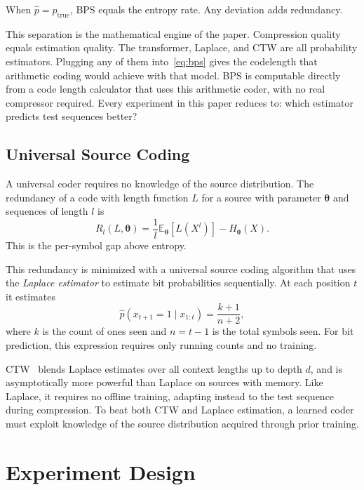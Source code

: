 \documentclass[onecolumn,english,12pt]{IEEEtran}
\theoremstyle{plain}
\theoremstyle{plain}
\theoremstyle{plain}
\theoremstyle{definition}
\begin{document}
When $\hat{p} = p_{\mathrm{true}}$, BPS equals the entropy rate. Any
deviation adds redundancy.

This separation is the mathematical engine of the paper. Compression
quality equals estimation quality. The transformer, Laplace, and CTW
are all probability estimators. Plugging any of them into~\eqref{eq:bps}
gives the codelength that arithmetic coding would achieve with that
model. BPS is computable directly from a code length calculator that uses this arithmetic coder, with no real compressor required. Every experiment in this paper reduces to: which estimator predicts test sequences better?

\subsection{Universal Source Coding}
\label{sec:universal}

A universal coder requires no knowledge of the source distribution. The redundancy of a code with length function $L$ for a source with
parameter $\boldsymbol{\theta}$ and sequences of length $l$ is
\begin{equation}
  R_l(L, \boldsymbol{\theta}) = \frac{1}{l}\mathbb{E}_{\boldsymbol{\theta}}[L(X^l)] - H_{\boldsymbol{\theta}}(X).
  \label{eq:redun}
\end{equation}
This is the per-symbol gap above entropy. 

This redundancy is minimized with a universal source coding algorithm that uses the \textit{Laplace estimator} to estimate bit probabilities sequentially. At each position $t$ it
estimates
\begin{equation}
  \hat{p}(x_{t+1}=1 \mid x_{1:t}) = \frac{k+1}{n+2},
  \label{eq:laplace}
\end{equation}
where $k$ is the count of ones seen and $n = t-1$ is the total symbols
seen. For bit prediction, this expression requires only running counts and no training.

CTW~\cite{gabeschamberg} blends Laplace estimates over all context lengths up to depth $d$, and is asymptotically more powerful than Laplace on sources with memory. Like Laplace, it requires no offline training, adapting instead to the test sequence during compression. To beat both CTW and Laplace estimation, a learned coder must exploit knowledge of the source distribution acquired through prior training.

\section{Experiment Design}
\label{sec:system}
\end{document}
